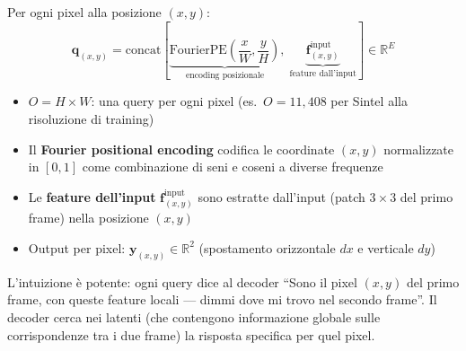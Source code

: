 \documentclass[12pt,a4paper]{article}
\begin{document}
\begin{formulabox}
Per ogni pixel alla posizione $(x, y)$:
\[
\mathbf{q}_{(x,y)} = \text{concat}\!\left[\underbrace{\text{FourierPE}\!\left(\frac{x}{W}, \frac{y}{H}\right)}_{\text{encoding posizionale}}, \; \underbrace{\mathbf{f}_{(x,y)}^{\text{input}}}_{\text{feature dall'input}}\right] \in \mathbb{R}^E
\]
\begin{itemize}
    \item $O = H \times W$: una query per ogni pixel (es.\ $O = 11{,}408$ per Sintel alla risoluzione di training)
    \item Il \textbf{Fourier positional encoding} codifica le coordinate $(x, y)$ normalizzate in $[0, 1]$ come combinazione di seni e coseni a diverse frequenze
    \item Le \textbf{feature dell'input} $\mathbf{f}_{(x,y)}^{\text{input}}$ sono estratte dall'input (patch $3 \times 3$ del primo frame) nella posizione $(x, y)$
    \item Output per pixel: $\mathbf{y}_{(x,y)} \in \mathbb{R}^2$ (spostamento orizzontale $dx$ e verticale $dy$)
\end{itemize}
\end{formulabox}

L'intuizione \`e potente: ogni query dice al decoder ``Sono il pixel $(x, y)$ del primo frame, con queste feature locali --- dimmi dove mi trovo nel secondo frame''. Il decoder cerca nei latenti (che contengono informazione globale sulle corrispondenze tra i due frame) la risposta specifica per quel pixel.
\end{document}
